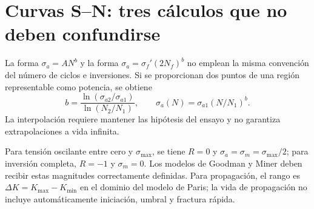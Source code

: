 \section{Curvas S--N: tres cálculos que no deben confundirse}
La forma $\sigma_a=A N^b$ y la forma $\sigma_a=\sigma_f'(2N_f)^b$ no emplean la misma convención del número de ciclos e inversiones. Si se proporcionan dos puntos de una región representable como potencia, se obtiene
\[
 b=\frac{\ln(\sigma_{a2}/\sigma_{a1})}{\ln(N_2/N_1)},\qquad
 \sigma_a(N)=\sigma_{a1}(N/N_1)^b.
\]
La interpolación requiere mantener las hipótesis del ensayo y no garantiza extrapolaciones a vida infinita.

Para tensión oscilante entre cero y $\sigma_{\max}$, se tiene $R=0$ y $\sigma_a=\sigma_m=\sigma_{\max}/2$; para inversión completa, $R=-1$ y $\sigma_m=0$. Los modelos de Goodman y Miner deben recibir estas magnitudes correctamente definidas. Para propagación, el rango es $\Delta K=K_{\max}-K_{\min}$ en el dominio del modelo de Paris; la vida de propagación no incluye automáticamente iniciación, umbral y fractura rápida.


